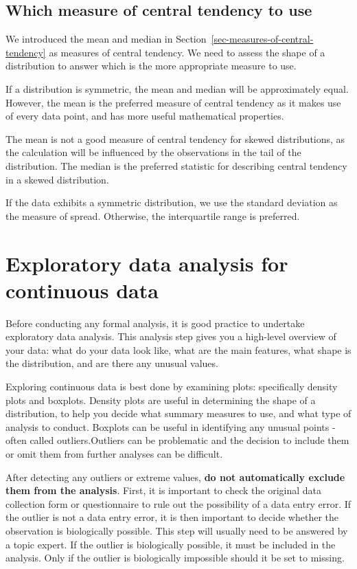 \documentclass[
  a4paper,
]{memoir}
\begin{document}
\subsection{Which measure of central tendency to
use}\label{which-measure-of-central-tendency-to-use}

We introduced the mean and median in
Section~\ref{sec-measures-of-central-tendency} as measures of central
tendency. We need to assess the shape of a distribution to answer which
is the more appropriate measure to use.

If a distribution is symmetric, the mean and median will be
approximately equal. However, the mean is the preferred measure of
central tendency as it makes use of every data point, and has more
useful mathematical properties.

The mean is not a good measure of central tendency for skewed
distributions, as the calculation will be influenced by the observations
in the tail of the distribution. The median is the preferred statistic
for describing central tendency in a skewed distribution.

If the data exhibits a symmetric distribution, we use the standard
deviation as the measure of spread. Otherwise, the interquartile range
is preferred.

\section{Exploratory data analysis for continuous
data}\label{sec-eda-cts}

Before conducting any formal analysis, it is good practice to undertake
exploratory data analysis. This analysis step gives you a high-level
overview of your data: what do your data look like, what are the main
features, what shape is the distribution, and are there any unusual
values.

Exploring continuous data is best done by examining plots: specifically
density plots and boxplots. Density plots are useful in determining the
shape of a distribution, to help you decide what summary measures to
use, and what type of analysis to conduct. Boxplots can be useful in
identifying any unusual points - often called outliers.Outliers can be
problematic and the decision to include them or omit them from further
analyses can be difficult.

After detecting any outliers or extreme values, \textbf{do not
automatically exclude them from the analysis}. First, it is important to
check the original data collection form or questionnaire to rule out the
possibility of a data entry error. If the outlier is not a data entry
error, it is then important to decide whether the observation is
biologically possible. This step will usually need to be answered by a
topic expert. If the outlier is biologically possible, it must be
included in the analysis. Only if the outlier is biologically impossible
should it be set to missing.
\end{document}
